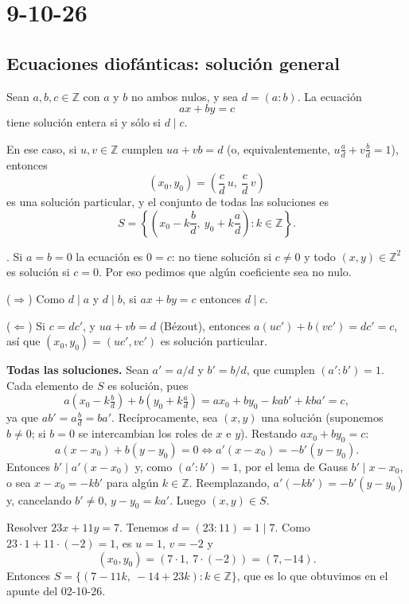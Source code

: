 \chapter{9-10-26}

\section{Ecuaciones diofánticas: solución general}

\begin{proposicion}
Sean $a,b,c\in\mathbb{Z}$ con $a$ y $b$ no ambos nulos, y sea $d=(a:b)$. La
ecuación
\[
ax+by=c
\]
tiene solución entera si y sólo si $d\mid c$.

En ese caso, si $u,v\in\mathbb{Z}$ cumplen $ua+vb=d$ (o, equivalentemente,
$u\frac{a}{d}+v\frac{b}{d}=1$), entonces
\[
(x_0,y_0)=\left(\frac{c}{d}\,u,\ \frac{c}{d}\,v\right)
\]
es una solución particular, y el conjunto de todas las soluciones es
\[
S=\left\{\left(x_0-k\frac{b}{d},\ y_0+k\frac{a}{d}\right) : k\in\mathbb{Z}\right\}.
\]
\end{proposicion}

\begin{nota}{.}
Si $a=b=0$ la ecuación es $0=c$: no tiene solución si $c\neq 0$ y todo
$(x,y)\in\mathbb{Z}^2$ es solución si $c=0$. Por eso pedimos que algún
coeficiente sea no nulo.
\end{nota}

\begin{demostracion}
($\Rightarrow$) Como $d\mid a$ y $d\mid b$, si $ax+by=c$ entonces $d\mid c$.

($\Leftarrow$) Si $c=dc'$, y $ua+vb=d$ (Bézout), entonces
$a(uc')+b(vc')=dc'=c$, así que $(x_0,y_0)=(uc',vc')$ es solución particular.

\textbf{Todas las soluciones.} Sean $a'=a/d$ y $b'=b/d$, que cumplen $(a':b')=1$.
Cada elemento de $S$ es solución, pues
\[
a\left(x_0-k\tfrac{b}{d}\right)+b\left(y_0+k\tfrac{a}{d}\right)=ax_0+by_0-kab'+kba'=c,
\]
ya que $ab'=a\frac{b}{d}=ba'$. Recíprocamente, sea $(x,y)$ una solución
(suponemos $b\neq 0$; si $b=0$ se intercambian los roles de $x$ e $y$).
Restando $ax_0+by_0=c$:
\[
a(x-x_0)+b(y-y_0)=0 \iff a'(x-x_0)=-b'(y-y_0).
\]
Entonces $b'\mid a'(x-x_0)$ y, como $(a':b')=1$, por el lema de Gauss
$b'\mid x-x_0$, o sea $x-x_0=-kb'$ para algún $k\in\mathbb{Z}$. Reemplazando,
$a'(-kb')=-b'(y-y_0)$ y, cancelando $b'\neq 0$, $y-y_0=ka'$. Luego
$(x,y)\in S$.
\end{demostracion}

\begin{ejemplo}
Resolver $23x+11y=7$. Tenemos $d=(23:11)=1\mid 7$. Como
$23\cdot 1+11\cdot(-2)=1$, es $u=1$, $v=-2$ y
\[
(x_0,y_0)=(7\cdot 1,\ 7\cdot(-2))=(7,-14).
\]
Entonces $S=\{(7-11k,\ -14+23k): k\in\mathbb{Z}\}$, que es lo que obtuvimos en el
apunte del 02-10-26.
\end{ejemplo}

